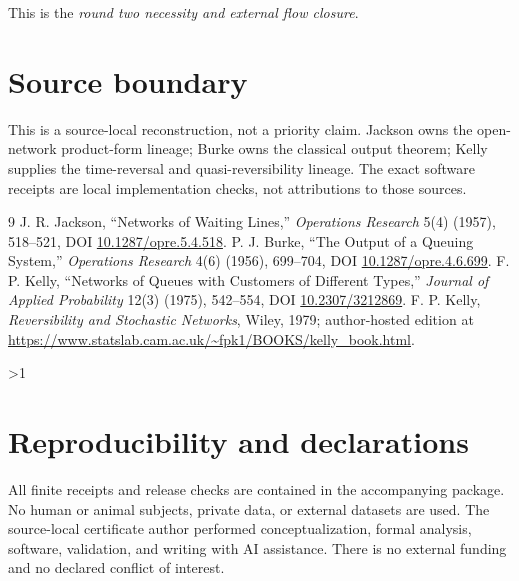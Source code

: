 \documentclass[10pt]{article}
\providecommand{\CRevisionRound}{2}
\begin{document}
This is the \emph{round two necessity and external flow closure}.
\fi

\section*{Source boundary}
This is a source-local reconstruction, not a priority claim. Jackson owns the
open-network product-form lineage; Burke owns the classical output theorem;
Kelly supplies the time-reversal and quasi-reversibility lineage. The exact
software receipts are local implementation checks, not attributions to those
sources.

\begin{thebibliography}{9}
J. R. Jackson, ``Networks of Waiting Lines,'' \emph{Operations Research}
5(4) (1957), 518--521, DOI \url{10.1287/opre.5.4.518}.
P. J. Burke, ``The Output of a Queuing System,'' \emph{Operations Research}
4(6) (1956), 699--704, DOI \url{10.1287/opre.4.6.699}.
F. P. Kelly, ``Networks of Queues with Customers of Different Types,''
\emph{Journal of Applied Probability} 12(3) (1975), 542--554,
DOI \url{10.2307/3212869}.
F. P. Kelly, \emph{Reversibility and Stochastic Networks}, Wiley, 1979;
author-hosted edition at \url{https://www.statslab.cam.ac.uk/~fpk1/BOOKS/kelly_book.html}.
\end{thebibliography}

\ifnum\CRevisionRound>1
\section*{Reproducibility and declarations}
All finite receipts and release checks are contained in the accompanying
package. No human or animal subjects, private data, or external datasets are
used. The source-local certificate author performed conceptualization,
formal analysis, software, validation, and writing with AI assistance.
There is no external funding and no declared conflict of interest.
\fi
\end{document}
